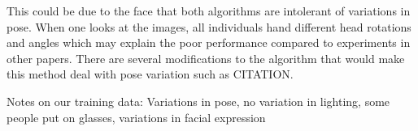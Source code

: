 \documentclass{article}
\begin{document}
This could be due to the face that both algorithms are intolerant of variations in pose. When one looks at the images, all individuals hand different head rotations and angles which may explain the poor performance compared to experiments in other papers\cite{belhumeur1997eigenfaces}. There are several modifications to the algorithm that would make this method deal with pose variation such as CITATION.

Notes on our training data: Variations in pose, no variation in lighting, some people put on glasses, variations in facial expression


\nocite{*} %


\end{document}
